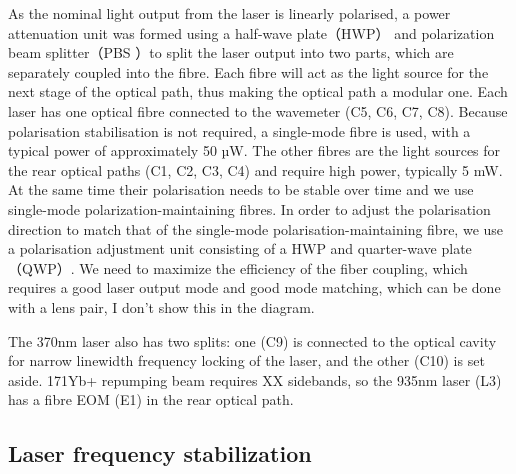 As the nominal light output from the laser is linearly polarised, a power attenuation unit was formed using a half-wave plate（HWP） and polarization beam splitter（PBS ）to split the laser output into two parts, which are separately coupled into the fibre. Each fibre will act as the light source for the next stage of the optical path, thus making the optical path a modular one. Each laser has one optical fibre connected to the wavemeter (C5, C6, C7, C8). Because polarisation stabilisation is not required, a single-mode fibre is used, with a typical power of approximately 50 µW. The other fibres are the light sources for the rear optical paths (C1, C2, C3, C4) and require high power, typically 5 mW. At the same time their polarisation needs to be stable over time and we use single-mode polarization-maintaining fibres. In order to adjust the polarisation direction to match that of the single-mode polarisation-maintaining fibre, we use a polarisation adjustment unit consisting of a HWP and quarter-wave plate（QWP）. We need to maximize the efficiency of the fiber coupling, which requires a good laser output mode and good mode matching, which can be done with a lens pair, I don't show this in the diagram.

The 370nm laser also has two splits: one (C9) is connected to the optical cavity for narrow linewidth frequency locking of the laser, and the other (C10) is set aside. 171Yb+ repumping beam requires XX sidebands, so the 935nm laser (L3) has a fibre EOM (E1) in the rear optical path.

\subsection{Laser frequency stabilization}

